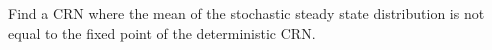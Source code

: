 \begin{problem}[advanced]
  Find a CRN where the mean of the stochastic steady state distribution is not equal to the fixed point of the deterministic CRN.
\end{problem}



\begin{further}
\end{further}